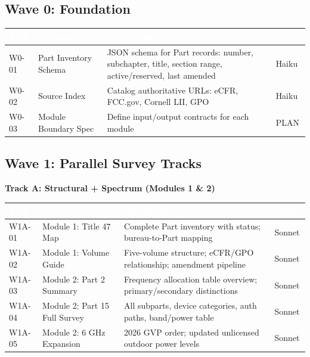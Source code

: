 \documentclass[11pt,letterpaper]{article}
\newcommand{\tableheader}[1]{\textbf{\sffamily\textcolor{white}{#1}}}
\begin{document}
\subsection{Wave 0: Foundation}

\begin{center}
\begin{tabularx}{\textwidth}{C{1.5cm}L{4cm}XC{2cm}}
\toprule
{}
\tableheader{Task} & \tableheader{Component} & \tableheader{Description} & \tableheader{Agent} \\
\midrule
W0-01 & Part Inventory Schema & JSON schema for Part records: number, subchapter, title, section range, active/reserved, last amended & Haiku \\
W0-02 & Source Index & Catalog authoritative URLs: eCFR, FCC.gov, Cornell LII, GPO & Haiku \\
W0-03 & Module Boundary Spec & Define input/output contracts for each module & PLAN \\
\bottomrule
\end{tabularx}
\end{center}

\subsection{Wave 1: Parallel Survey Tracks}

\textbf{Track A: Structural + Spectrum (Modules 1 \& 2)}

\begin{center}
\begin{tabularx}{\textwidth}{C{1.5cm}L{3.5cm}XC{1.5cm}}
\toprule
{}
\tableheader{Task} & \tableheader{Component} & \tableheader{Description} & \tableheader{Model} \\
\midrule
W1A-01 & Module 1: Title 47 Map & Complete Part inventory with status; bureau-to-Part mapping & Sonnet \\
W1A-02 & Module 1: Volume Guide & Five-volume structure; eCFR/GPO relationship; amendment pipeline & Sonnet \\
W1A-03 & Module 2: Part 2 Summary & Frequency allocation table overview; primary/secondary distinctions & Sonnet \\
W1A-04 & Module 2: Part 15 Full Survey & All subparts, device categories, auth paths, band/power table & Sonnet \\
W1A-05 & Module 2: 6 GHz Expansion & 2026 GVP order; updated unlicensed outdoor power levels & Sonnet \\
\bottomrule
\end{tabularx}
\end{center}
\end{document}
